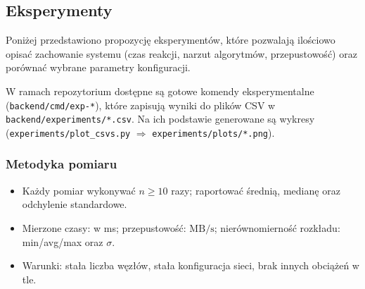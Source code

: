 \documentclass[12pt,a4paper]{article}
\begin{document}
	\subsection{Eksperymenty}
	Poniżej przedstawiono propozycję eksperymentów, które pozwalają ilościowo opisać zachowanie systemu (czas reakcji, narzut algorytmów, przepustowość) oraz porównać wybrane parametry konfiguracji.

	W ramach repozytorium dostępne są gotowe komendy eksperymentalne (\texttt{backend/cmd/exp-*}), które zapisują wyniki do plików CSV w \texttt{backend/experiments/*.csv}. Na ich podstawie generowane są wykresy (\texttt{experiments/plot\_csvs.py} \(\Rightarrow\) \texttt{experiments/plots/*.png}).

	\subsubsection{Metodyka pomiaru}
	\begin{itemize}
		\item Każdy pomiar wykonywać $n\ge 10$ razy; raportować średnią, medianę oraz odchylenie standardowe.
		\item Mierzone czasy: w ms; przepustowość: $\mathrm{MB}/\mathrm{s}$; nierównomierność rozkładu: min/avg/max oraz $\sigma$.
		\item Warunki: stała liczba węzłów, stała konfiguracja sieci, brak innych obciążeń w tle.
	\end{itemize}
\end{document}
